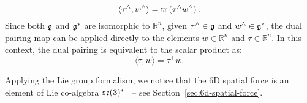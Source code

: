 \begin{equation}
  \langle \tau^\wedge, w^\wedge \rangle = \operatorname{tr}\left(\tau^\wedge  {w^\wedge }\right).
\end{equation}
Since both $\mathfrak{g}$ and $\mathfrak{g}^*$ are isomorphic to $\mathbb{R}^n$, given $\tau^\wedge \in \mathfrak{g}$ and $w^\wedge\in \mathfrak{g}^*$, the dual pairing map can be applied directly to the elements $w \in \mathbb{R}^n$ and $\tau \in \mathbb{R}^n$. In this context, the dual pairing is equivalent to the scalar product as:
\begin{equation}
  \langle \tau, w \rangle = \tau ^\top w.
\end{equation}
\par
Applying the Lie group formalism, we notice that the 6D spatial force is an element of Lie co-algebra $\mathfrak{se}(3)^*$~\citep[Chapter~6]{Holm2008GeometricRolling} -- see Section~\ref{sec:6d-spatial-force}.

